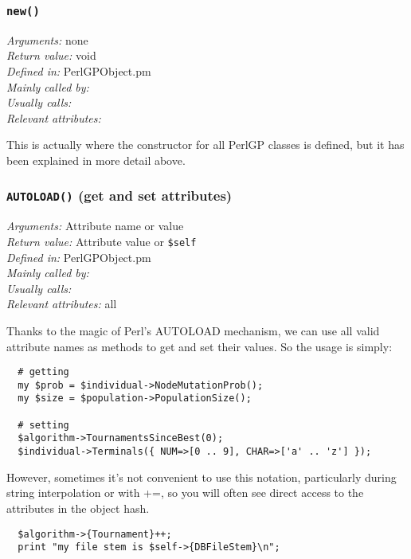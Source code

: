 \documentclass[a4paper]{article}
\begin{document}
\subsubsection{\texttt{new()}}\label{PerlGPObject::new}
\begin{flushleft}
\textit{Arguments:} none\\
\textit{Return value:} void\\
\textit{Defined in:} PerlGPObject.pm\\
\textit{Mainly called by:} \\
\textit{Usually calls:} \\
\textit{Relevant attributes:}
\end{flushleft}

This is actually where the constructor for all PerlGP classes is
defined, but it has been explained in more detail above.

\subsubsection{\texttt{AUTOLOAD()} (get and set attributes)}\label{xref:getset}
\begin{flushleft}
\textit{Arguments:} Attribute name or value \\
\textit{Return value:} Attribute value or \texttt{\$self}\\
\textit{Defined in:} PerlGPObject.pm\\
\textit{Mainly called by:} \\
\textit{Usually calls:} \\
\textit{Relevant attributes:} all
\end{flushleft}

Thanks to the magic of Perl's AUTOLOAD mechanism, we can use all valid
attribute names as methods to get and set their values.  So the usage
is simply:

\begin{verbatim}
  # getting
  my $prob = $individual->NodeMutationProb();
  my $size = $population->PopulationSize();

  # setting
  $algorithm->TournamentsSinceBest(0);
  $individual->Terminals({ NUM=>[0 .. 9], CHAR=>['a' .. 'z'] });
\end{verbatim}

However, sometimes it's not convenient to use this notation,
particularly during string interpolation or with +=, so you
will often see direct access to the attributes in the object
hash.

\begin{verbatim}
  $algorithm->{Tournament}++;
  print "my file stem is $self->{DBFileStem}\n";
\end{verbatim}
\end{document}
